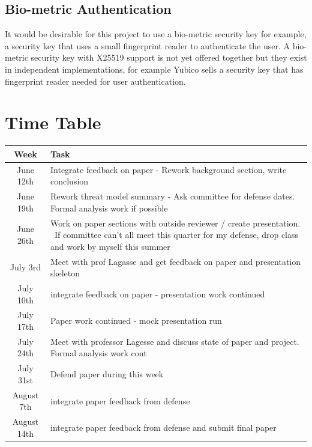 \documentclass [11pt, proquest] {uwthesis}[2020/02/24]
\begin{document}
\subsection{Bio-metric Authentication}
It would be desirable for this project to use a bio-metric security key for example, a security key that uses a small fingerprint reader to authenticate the user. A bio-metric security key with X25519 support is not yet offered together but they exist in independent implementations, for example Yubico sells a security key that has fingerprint reader needed for user authentication\cite{yubico_yubikey_2022}. 


\section {Time Table}
\begin{center}
\begin{tabular}{ |c|l| }
 \hline
Week & Task \\
 \hline
June 12th & Integrate feedback on paper - 
Rework background section, write conclusion \\ 
  \hline
June 19th & Rework threat model summary - Ask committee for defense dates. 
Formal analysis work if possible \\ 
  \hline
June 26th & Work on paper sections with outside reviewer / create presentation. \
If committee can't all meet this quarter for my defense, drop class and work by myself this summer   \\  
 \hline
July 3rd & Meet with prof Lagasse and get feedback on paper and presentation skeleton \\  
 \hline
July 10th & integrate feedback on paper - presentation work continued \\  
 \hline
July 17th & Paper work continued - mock presentation run \\  
 \hline
July 24th & Meet with professor Lagesse and discuss state of paper and project.
Formal analysis work cont  \\  
 \hline
July 31st & Defend paper during this week  \\  
 \hline
August 7th & integrate paper feedback from defense  \\  
 \hline
August 14th & integrate paper feedback from defense and submit final paper  \\  
 \hline

 
\end{tabular}
\end{center}




\end{document}
